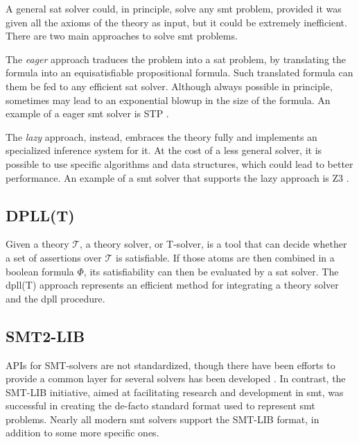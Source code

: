 A general \gls{sat} solver could, in principle, solve any \gls{smt} problem, provided it was given all the axioms of the theory as input, but it could be extremely inefficient.
There are two main approaches to solve \gls{smt} problems.

The \textit{eager} approach traduces the problem into a \gls{sat} problem, by translating the formula into an equisatisfiable propositional formula.
Such translated formula can them be fed to any efficient \gls{sat} solver.
Although always possible in principle, sometimes may lead to an exponential blowup in the size of the formula.
An example of a eager \gls{smt} solver is STP \cite{repo:stp}.

The \textit{lazy} approach, instead, embraces the theory fully and implements an specialized inference system for it.
At the cost of a less general solver, it is possible to use specific algorithms and data structures, which could lead to better performance.
An example of a \gls{smt} solver that supports the lazy approach is Z3 \cite{repo:z3}.

\subsection*{DPLL(T)}

Given a theory $\mathcal{T}$, a theory solver, or T-solver, is a tool that can decide whether a set of assertions over $\mathcal{T}$ is satisfiable.
If those atoms are then combined in a boolean formula $\Phi$, its satisfiability can then be evaluated by a \gls{sat} solver.
The \gls{dpll}(T) approach represents an efficient method for integrating a theory solver and the \gls{dpll} procedure.

\subsection*{SMT2-LIB}

APIs for SMT-solvers are not standardized, though there have been efforts to provide a common layer for several solvers has been developed \cite{repo:java-smt}.
In contrast, the SMT-LIB initiative, aimed at facilitating research and development in \gls{smt}, was successful in creating the de-facto standard format used to represent \gls{smt} problems.
Nearly all modern \gls{smt} solvers support the SMT-LIB format, in addition to some more specific ones.



